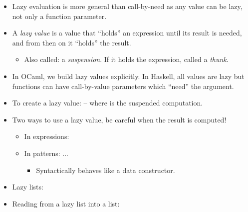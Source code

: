 \documentclass{beamer}
\newcommand{\tmem}[1]{{\em #1\/}}
\newcommand{\tmverbatim}[1]{\text{{\ttfamily{#1}}}}
\begin{document}
\begin{itemize}
  \item Lazy evaluation is more general than call-by-need as any value can be
  lazy, not only a function parameter.
  
  \item A {\tmem{lazy value}} is a value that ``holds'' an expression until
  its result is needed, and from then on it ``holds'' the result.
  \begin{itemize}
    \item Also called: a {\tmem{suspension}}. If it holds the expression,
    called a {\tmem{thunk}}.
  \end{itemize}
  \item In OCaml, we build lazy values explicitly. In Haskell, all values are
  lazy but functions can have call-by-value parameters which ``need'' the
  argument.
  
  \item To create a lazy value: {}{} -- where
  \tmverbatim{expr} is the suspended computation.
  
  \item Two ways to use a lazy value, be careful when the result is computed!
  \begin{itemize}
    \item In expressions: {}{}{}
    
    \item In patterns: {}{}{}{}{\hlopt{->}} ...
    \begin{itemize}
      \item Syntactically {}behaves like a data constructor.
    \end{itemize}
  \end{itemize}
  \item Lazy lists:
  
  {}{}{\hlopt{= }}{}{\hlopt{\textbar }}{}{}{}{\hlopt{*
  }}{}{}{}{}{\hlendline{}}
  
  \item Reading from a lazy list into a list:
  
  {}{}{\hlopt{=
  }}{}{\hlendline{}}\\
  {\hlstd{ {\hlopt{\textbar}} }}{}{\hlopt{(}}{}{\hlopt{, }}{}{}{\hlopt{)
  }}{}{}{\hlopt{> }}{}{\hlopt{->
  }}{}{\hlopt{::(}}{}{\hlopt{(}}{}{\hlopt{-}}{}{\hlopt{)
  }}{}{\hlopt{)}}{\hlendline{}}\\
  {\hlstd{ {\hlopt{\textbar}} {\textunderscore} }}{\hlopt{->
  []}}{\hlendline{}}
  

\end{itemize}
\end{document}
